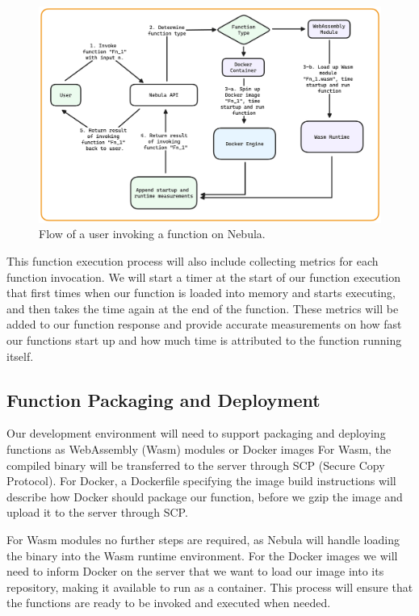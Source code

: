 \documentclass[
  table]{report}
\begin{document}
\begin{figure}[H]
\centering
  \includegraphics{assets/5-nebula-function-execution.png}
  \caption{Flow of a user invoking a function on Nebula.}
  \label{fig:function-execution-design}
\end{figure}

This function execution process will also include collecting metrics for
each function invocation. We will start a timer at the start of our
function execution that first times when our function is loaded into
memory and starts executing, and then takes the time again at the end of
the function. These metrics will be added to our function response and
provide accurate measurements on how fast our functions start up and how
much time is attributed to the function running itself.

\subsection{Function Packaging and Deployment}

Our development environment will need to support packaging and deploying
functions as WebAssembly (Wasm) modules or Docker images For Wasm, the
compiled binary will be transferred to the server through SCP (Secure
Copy Protocol). For Docker, a Dockerfile specifying the image build
instructions will describe how Docker should package our function,
before we gzip the image and upload it to the server through SCP.

For Wasm modules no further steps are required, as Nebula will handle
loading the binary into the Wasm runtime environment. For the Docker
images we will need to inform Docker on the server that we want to load
our image into its repository, making it available to run as a
container. This process will ensure that the functions are ready to be
invoked and executed when needed.
\end{document}
